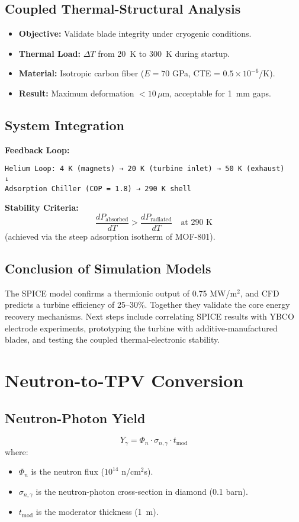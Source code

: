 \documentclass[12pt]{article}
\begin{document}
\subsection{Coupled Thermal-Structural Analysis}
\begin{itemize}
    \item \textbf{Objective:} Validate blade integrity under cryogenic conditions.
    \item \textbf{Thermal Load:} $\Delta T$ from 20~K to 300~K during startup.
    \item \textbf{Material:} Isotropic carbon fiber ($E = 70$ GPa, CTE = $0.5\times10^{-6}$/K).
    \item \textbf{Result:} Maximum deformation $<10\,\mu$m, acceptable for 1~mm gaps.
\end{itemize}

\subsection{System Integration}
\textbf{Feedback Loop:}
\begin{verbatim}
Helium Loop: 4 K (magnets) → 20 K (turbine inlet) → 50 K (exhaust)
↓
Adsorption Chiller (COP = 1.8) → 290 K shell
\end{verbatim}

\noindent \textbf{Stability Criteria:}
\[
\frac{dP_{\text{absorbed}}}{dT} > \frac{dP_{\text{radiated}}}{dT} \quad \text{at 290 K}
\]
(achieved via the steep adsorption isotherm of MOF-801).

\subsection{Conclusion of Simulation Models}
The SPICE model confirms a thermionic output of 0.75 MW/m$^2$, and CFD predicts a turbine efficiency of 25--30\%. Together they validate the core energy recovery mechanisms. Next steps include correlating SPICE results with YBCO electrode experiments, prototyping the turbine with additive-manufactured blades, and testing the coupled thermal-electronic stability.

\section{Neutron-to-TPV Conversion}
\subsection{Neutron-Photon Yield}
\begin{equation}
    Y_{\gamma} = \Phi_n \cdot \sigma_{n,\gamma} \cdot t_{\text{mod}}
\end{equation}
where:
\begin{itemize}
    \item $\Phi_n$ is the neutron flux ($10^{14}$ n/cm$^2$s).
    \item $\sigma_{n,\gamma}$ is the neutron-photon cross-section in diamond (0.1 barn).
    \item $t_{\text{mod}}$ is the moderator thickness (1~m).
\end{itemize}
\end{document}

